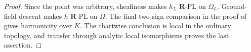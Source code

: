 \begin{proof}
Since the point was arbitrary, sheafiness makes $h_L$ $\mathbf R$-PL on
$\Omega_L$.  Ground-field descent \cite[Corollary~5.12]{GJR26} makes $h$
$\mathbf R$-PL on $\Omega$.  The final two-sign comparison in the proof of
 gives
harmonicity over $K$.  The chartwise conclusion is local in the ordinary
topology, and transfer through analytic local isomorphisms proves the last
assertion.
\end{proof}
